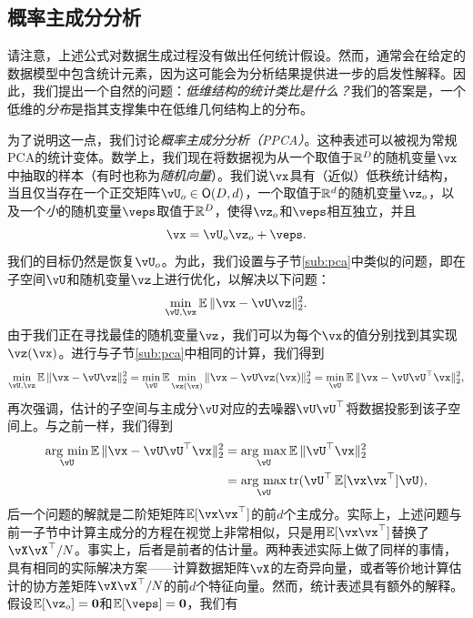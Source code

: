 \documentclass[../../book-main_zh.tex]{subfiles}
\begin{document}
\subsection{概率主成分分析}

请注意，上述公式对数据生成过程没有做出任何统计假设。然而，通常会在给定的数据模型中包含统计元素，因为这可能会为分析结果提供进一步的启发性解释。因此，我们提出一个自然的问题：\textit{低维结构的统计类比是什么？}我们的答案是，一个低维的\textit{分布}是指其支撑集中在低维几何结构上的分布。

为了说明这一点，我们讨论\textit{概率主成分分析（PPCA）}。这种表述可以被视为常规PCA的统计变体。数学上，我们现在将数据视为从一个取值于\(\mathbb{R}^{D}\)的随机变量\(\vx\)中抽取的样本（有时也称为\textit{随机向量}）。我们说\(\vx\)具有（近似）低秩统计结构，当且仅当存在一个正交矩阵\(\vU_{o} \in \O(D, d)\)，一个取值于\(\mathbb{R}^{d}\)的随机变量\(\vz_{o}\)，以及一个\textit{小}的随机变量\(\veps\)取值于\(\mathbb{R}^{D}\)，使得\(\vz_{o}\)和\(\veps\)相互独立，并且
\begin{equation}
    \vx = \vU_{o}\vz_{o} + \veps.
\end{equation}
我们的目标仍然是恢复\(\vU_{o}\)。为此，我们设置与子节\eqref{sub:pca}中类似的问题，即在子空间\(\vU\)和随机变量\(\vz\)上进行优化，以解决以下问题：
\begin{equation}
    \min_{\vU, \vz}\Ex\norm{\vx - \vU\vz}_{2}^{2}.
\end{equation}
由于我们正在寻找最佳的随机变量\(\vz\)，我们可以为每个\(\vx\)的值分别找到其实现\(\vz(\vx)\)。进行与子节\eqref{sub:pca}中相同的计算，我们得到 %
\begin{equation}\label{eq:ppca_denoising}
    \min_{\vU, \vz}\Ex\norm{\vx - \vU\vz}_{2}^{2} = \min_{\vU}\Ex\min_{\vz(\vx)}\norm{\vx - \vU\vz(\vx)}_{2}^{2} = \min_{\vU}\Ex\norm{\vx - \vU\vU^{\top}\vx}_{2}^{2},
\end{equation}
再次强调，估计的子空间与主成分\(\vU\)对应的去噪器\(\vU\vU^{\top}\)将数据投影到该子空间上。与之前一样，我们得到
\begin{align}
    \argmin_{\vU}\Ex\norm{\vx - \vU\vU^{\top}\vx}_{2}^{2} 
    &= \argmax_{\vU}\Ex\norm{\vU^{\top}\vx}_{2}^{2} \\
    &= \argmax_{\vU}\tr(\vU^{\top}\Ex[\vx\vx^{\top}]\vU),
\end{align}
后一个问题的解就是二阶矩矩阵\(\Ex[\vx\vx^{\top}]\)的前\(d\)个主成分。实际上，上述问题与前一子节中计算主成分的方程在视觉上非常相似，只是用\(\Ex[\vx\vx^{\top}]\)替换了\(\vX\vX^{\top}/N\)。事实上，后者是前者的估计量。两种表述实际上做了同样的事情，具有相同的实际解决方案——计算数据矩阵\(\vX\)的左奇异向量，或者等价地计算估计的协方差矩阵\(\vX\vX^{\top}/N\)的前\(d\)个特征向量。然而，统计表述具有额外的解释。假设\(\Ex[\vz_{o}] = \vzero\)和\(\Ex[\veps] = \vzero\)，我们有
\end{document}
